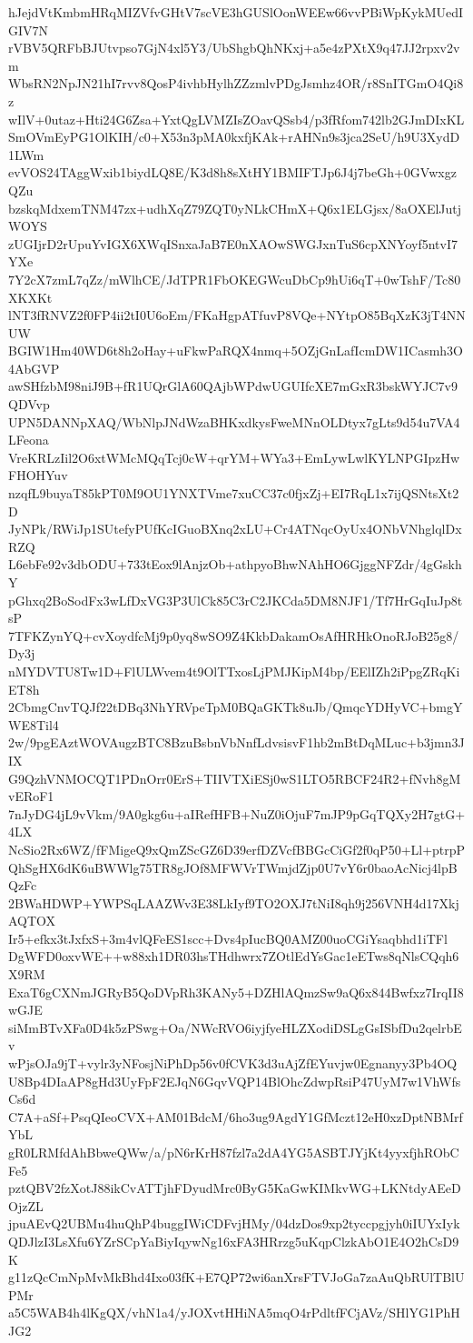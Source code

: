 hJejdVtKmbmHRqMIZVfvGHtV7scVE3hGUSlOonWEEw66vvPBiWpKykMUedIGIV7N
rVBV5QRFbBJUtvpso7GjN4xl5Y3/UbShgbQhNKxj+a5e4zPXtX9q47JJ2rpxv2vm
WbsRN2NpJN21hI7rvv8QosP4ivhbHylhZZzmlvPDgJsmhz4OR/r8SnITGmO4Qi8z
wIlV+0utaz+Hti24G6Zsa+YxtQgLVMZIsZOavQSsb4/p3fRfom742lb2GJmDIxKL
SmOVmEyPG1OlKIH/c0+X53n3pMA0kxfjKAk+rAHNn9s3jca2SeU/h9U3XydD1LWm
evVOS24TAggWxib1biydLQ8E/K3d8h8sXtHY1BMIFTJp6J4j7beGh+0GVwxgzQZu
bzskqMdxemTNM47zx+udhXqZ79ZQT0yNLkCHmX+Q6x1ELGjsx/8aOXElJutjWOYS
zUGIjrD2rUpuYvIGX6XWqISnxaJaB7E0nXAOwSWGJxnTuS6cpXNYoyf5ntvI7YXe
7Y2cX7zmL7qZz/mWlhCE/JdTPR1FbOKEGWcuDbCp9hUi6qT+0wTshF/Tc80XKXKt
lNT3fRNVZ2f0FP4ii2tI0U6oEm/FKaHgpATfuvP8VQe+NYtpO85BqXzK3jT4NNUW
BGIW1Hm40WD6t8h2oHay+uFkwPaRQX4nmq+5OZjGnLafIcmDW1ICasmh3O4AbGVP
awSHfzbM98niJ9B+fR1UQrGlA60QAjbWPdwUGUIfcXE7mGxR3bskWYJC7v9QDVvp
UPN5DANNpXAQ/WbNlpJNdWzaBHKxdkysFweMNnOLDtyx7gLts9d54u7VA4LFeona
VreKRLzIil2O6xtWMcMQqTcj0cW+qrYM+WYa3+EmLywLwlKYLNPGIpzHwFHOHYuv
nzqfL9buyaT85kPT0M9OU1YNXTVme7xuCC37c0fjxZj+EI7RqL1x7ijQSNtsXt2D
JyNPk/RWiJp1SUtefyPUfKcIGuoBXnq2xLU+Cr4ATNqcOyUx4ONbVNhglqlDxRZQ
L6ebFe92v3dbODU+733tEox9lAnjzOb+athpyoBhwNAhHO6GjggNFZdr/4gGskhY
pGhxq2BoSodFx3wLfDxVG3P3UlCk85C3rC2JKCda5DM8NJF1/Tf7HrGqIuJp8tsP
7TFKZynYQ+cvXoydfcMj9p0yq8wSO9Z4KkbDakamOsAfHRHkOnoRJoB25g8/Dy3j
nMYDVTU8Tw1D+FlULWvem4t9OlTTxosLjPMJKipM4bp/EElIZh2iPpgZRqKiET8h
2CbmgCnvTQJf22tDBq3NhYRVpeTpM0BQaGKTk8uJb/QmqcYDHyVC+bmgYWE8Til4
2w/9pgEAztWOVAugzBTC8BzuBsbnVbNnfLdvsisvF1hb2mBtDqMLuc+b3jmn3JIX
G9QzhVNMOCQT1PDnOrr0ErS+TIIVTXiESj0wS1LTO5RBCF24R2+fNvh8gMvERoF1
7nJyDG4jL9vVkm/9A0gkg6u+aIRefHFB+NuZ0iOjuF7mJP9pGqTQXy2H7gtG+4LX
NcSio2Rx6WZ/fFMigeQ9xQmZScGZ6D39erfDZVcfBBGcCiGf2f0qP50+Ll+ptrpP
QhSgHX6dK6uBWWlg75TR8gJOf8MFWVrTWmjdZjp0U7vY6r0baoAcNicj4lpBQzFc
2BWaHDWP+YWPSqLAAZWv3E38LkIyf9TO2OXJ7tNiI8qh9j256VNH4d17XkjAQTOX
Ir5+efkx3tJxfxS+3m4vlQFeES1scc+Dvs4pIucBQ0AMZ00uoCGiYsaqbhd1iTFl
DgWFD0oxvWE++w88xh1DR03hsTHdhwrx7ZOtlEdYsGac1eETws8qNlsCQqh6X9RM
ExaT6gCXNmJGRyB5QoDVpRh3KANy5+DZHlAQmzSw9aQ6x844Bwfxz7IrqII8wGJE
siMmBTvXFa0D4k5zPSwg+Oa/NWcRVO6iyjfyeHLZXodiDSLgGsISbfDu2qelrbEv
wPjsOJa9jT+vylr3yNFosjNiPhDp56v0fCVK3d3uAjZfEYuvjw0Egnanyy3Pb4OQ
U8Bp4DIaAP8gHd3UyFpF2EJqN6GqvVQP14BlOhcZdwpRsiP47UyM7w1VhWfsCs6d
C7A+aSf+PsqQIeoCVX+AM01BdcM/6ho3ug9AgdY1GfMczt12eH0xzDptNBMrfYbL
gR0LRMfdAhBbweQWw/a/pN6rKrH87fzl7a2dA4YG5ASBTJYjKt4yyxfjhRObCFe5
pztQBV2fzXotJ88ikCvATTjhFDyudMrc0ByG5KaGwKIMkvWG+LKNtdyAEeDOjzZL
jpuAEvQ2UBMu4huQhP4buggIWiCDFvjHMy/04dzDos9xp2tyccpgjyh0iIUYxIyk
QDJlzI3LsXfu6YZrSCpYaBiyIqywNg16xFA3HRrzg5uKqpClzkAbO1E4O2hCsD9K
g11zQcCmNpMvMkBhd4Ixo03fK+E7QP72wi6anXrsFTVJoGa7zaAuQbRUlTBlUPMr
a5C5WAB4h4lKgQX/vhN1a4/yJOXvtHHiNA5mqO4rPdltfFCjAVz/SHlYG1PhHJG2

